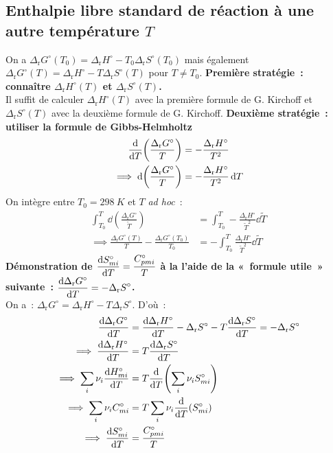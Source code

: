 \documentclass{article}
\newcommand{\ds}{\displaystyle}
\newcommand{\Dr}{\Delta_{\mathrm{r}}}
\newcommand{\Tz}{T_0 = \SI{298}{K}}
\begin{document}
\subsection{Enthalpie libre standard de réaction à une autre température $T$}
\begin{tableau}
    On a $\Dr G^\circ (T_0) = \Dr H^\circ - T_0\Dr S^\circ(T_0)$ mais également $\Dr G^\circ (T) = \Dr H^\circ - T\Dr S^\circ(T)$ pour $T\neq T_0$.
    \tcbline
    \textbf{Première stratégie~: connaître $\Dr H^\circ(T)$ et $\Dr S^\circ(T)$.}\\
    Il suffit de calculer $\Dr H^\circ(T)$ avec la première formule de G. Kirchoff et $\Dr S^\circ(T)$ avec la deuxième formule de G. Kirchoff.
    \tcbline
    \textbf{Deuxième stratégie~: utiliser la formule de Gibbs-Helmholtz}
    \begin{align*}
        \dv{T}(\frac{\Dr G^\circ}{T}) &= -\frac{\Dr H^\circ}{T^2}\\
        \implies \dd(\frac{\Dr G^\circ}{T}) &= -\frac{\Dr H^\circ}{T^2}\dd{T}
    \end{align*}
    On intègre entre $\Tz$ et $T$ \textit{ad hoc}~:
    \begin{align*}
        \int_{T_0}^T \dd(\frac{\Dr G^\circ}{\tilde{T}}) &= \int_{T_0}^T -\frac{\Dr H^\circ}{\tilde{T}^2}\dd{\tilde{T}}\\
        \implies \frac{\Dr G^\circ(T)}{T}-\frac{\Dr G^\circ(T_0)}{T_0} &= - \int_{T_0}^T \frac{\Dr H^\circ}{\tilde{T}^2}\dd{\tilde{T}}
    \end{align*}
    \tcbline
    \textbf{Démonstration de $\ds\dv{S_{mi}^\circ}{T} = \frac{C_{pmi}^\circ}{T}$ à la l'aide de la «~formule utile~» suivante~: $\ds \dv{\Dr G^\circ}{T} =-\Dr S^\circ$.}\\
    
    On a~: $\Dr G^\circ = \Dr H^\circ -T\Dr S^\circ$. D'où~:
    \begin{align*}
        \dv{\Dr G^\circ}{T} &= \dv{\Dr H^\circ}{T} - \Dr S^\circ - T\dv{\Dr S^\circ}{T}=-\Dr S^\circ\\
        \implies \dv{\Dr H^\circ}{T} &= T\dv{\Dr S^\circ}{T}\\
        \implies \sum_i \nu_i \dv{H_{mi}^\circ}{T} &= T\dv{T}(\sum_i \nu_i S_{mi}^\circ)\\
        \implies \sum_i \nu_i C_{mi}^\circ &= T\sum_i \nu_i\dv{T}( S_{mi}^\circ)\\
        \implies \dv{S_{mi}^\circ}{T} &= \frac{C_{pmi}^\circ}{T}
    \end{align*}
\end{tableau}
\end{document}
